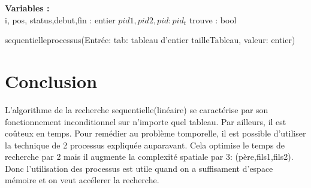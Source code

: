\begin{function}[H]
    \textbf{Variables :}\\
    i, pos, status,debut,fin : entier\;
    $pid1, pid2, pid : pid_t$\;
    trouve : bool\;
    
    \caption{sequentielleprocessus(Entrée: tab: tableau d'entier tailleTableau, valeur: entier)}
\end{function}

\section{Conclusion}
L'algorithme de la recherche sequentielle(linéaire) se caractérise par son fonctionnement inconditionnel sur n'importe quel tableau. Par ailleurs, il est coûteux en temps. Pour remédier au problème tomporelle, il est possible d'utiliser  la technique de 2 processus expliquée auparavant. Cela optimise le temps de recherche par 2 mais il augmente la complexité spatiale par 3: (père,fils1,fils2). Donc l'utilisation des processus est utile quand on a suffisament d'espace mémoire et on veut accélerer la recherche.

